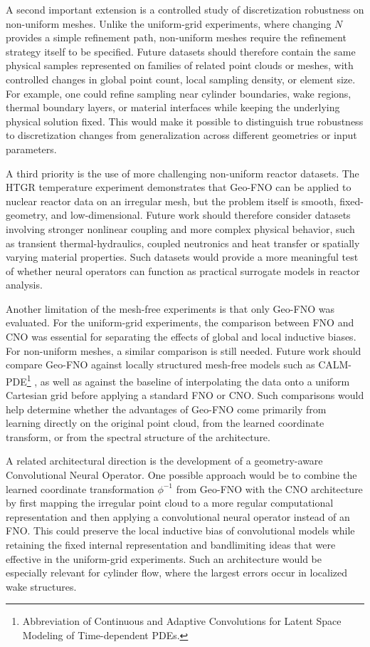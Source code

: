 A second important extension is a controlled study of discretization robustness on non-uniform meshes. Unlike the uniform-grid experiments, where changing \(N\) provides a simple refinement path, non-uniform meshes require the refinement strategy itself to be specified. Future datasets should therefore contain the same physical samples represented on families of related point clouds or meshes, with controlled changes in global point count, local sampling density, or element size. For example, one could refine sampling near cylinder boundaries, wake regions, thermal boundary layers, or material interfaces while keeping the underlying physical solution fixed. This would make it possible to distinguish true robustness to discretization changes from generalization across different geometries or input parameters.

A third priority is the use of more challenging non-uniform reactor datasets. The HTGR temperature experiment demonstrates that Geo-FNO can be applied to nuclear reactor data on an irregular mesh, but the problem itself is smooth, fixed-geometry, and low-dimensional. Future work should therefore consider datasets involving stronger nonlinear coupling and more complex physical behavior, such as transient thermal-hydraulics, coupled neutronics and heat transfer or spatially varying material properties. Such datasets would provide a more meaningful test of whether neural operators can function as practical surrogate models in reactor analysis.

Another limitation of the mesh-free experiments is that only Geo-FNO was evaluated. For the uniform-grid experiments, the comparison between FNO and CNO was essential for separating the effects of global and local inductive biases. For non-uniform meshes, a similar comparison is still needed. Future work should compare Geo-FNO against locally structured mesh-free models such as CALM-PDE\footnote{Abbreviation of Continuous and Adaptive Convolutions for Latent Space Modeling of Time-dependent PDEs.} \cite{calm-pde}, as well as against the baseline of interpolating the data onto a uniform Cartesian grid before applying a standard FNO or CNO. Such comparisons would help determine whether the advantages of Geo-FNO come primarily from learning directly on the original point cloud, from the learned coordinate transform, or from the spectral structure of the architecture.

A related architectural direction is the development of a geometry-aware Convolutional Neural Operator. One possible approach would be to combine the learned coordinate transformation \(\phi^{-1}\) from Geo-FNO with the CNO architecture by first mapping the irregular point cloud to a more regular computational representation and then applying a convolutional neural operator instead of an FNO. This could preserve the local inductive bias of convolutional models while retaining the fixed internal representation and bandlimiting ideas that were effective in the uniform-grid experiments. Such an architecture would be especially relevant for cylinder flow, where the largest errors occur in localized wake structures.

